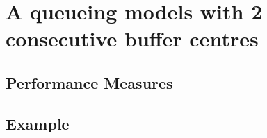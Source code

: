 \section{A queueing models with 2 consecutive buffer centres}

\subsection{Performance Measures}

\subsection{Example}